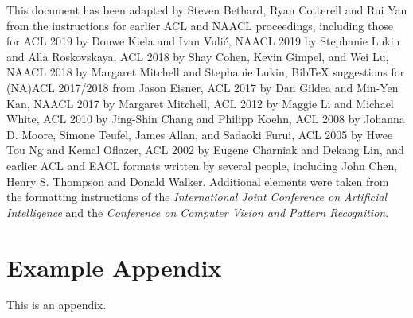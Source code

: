 \documentclass[11pt]{article}
\begin{document}
This document has been adapted
by Steven Bethard, Ryan Cotterell and Rui Yan
from the instructions for earlier ACL and NAACL proceedings, including those for
ACL 2019 by Douwe Kiela and Ivan Vuli\'{c},
NAACL 2019 by Stephanie Lukin and Alla Roskovskaya,
ACL 2018 by Shay Cohen, Kevin Gimpel, and Wei Lu,
NAACL 2018 by Margaret Mitchell and Stephanie Lukin,
Bib\TeX{} suggestions for (NA)ACL 2017/2018 from Jason Eisner,
ACL 2017 by Dan Gildea and Min-Yen Kan,
NAACL 2017 by Margaret Mitchell,
ACL 2012 by Maggie Li and Michael White,
ACL 2010 by Jing-Shin Chang and Philipp Koehn,
ACL 2008 by Johanna D. Moore, Simone Teufel, James Allan, and Sadaoki Furui,
ACL 2005 by Hwee Tou Ng and Kemal Oflazer,
ACL 2002 by Eugene Charniak and Dekang Lin,
and earlier ACL and EACL formats written by several people, including
John Chen, Henry S. Thompson and Donald Walker.
Additional elements were taken from the formatting instructions of the \emph{International Joint Conference on Artificial Intelligence} and the \emph{Conference on Computer Vision and Pattern Recognition}.

%



\appendix

\section{Example Appendix}
\label{sec:appendix}

This is an appendix.
\end{document}
